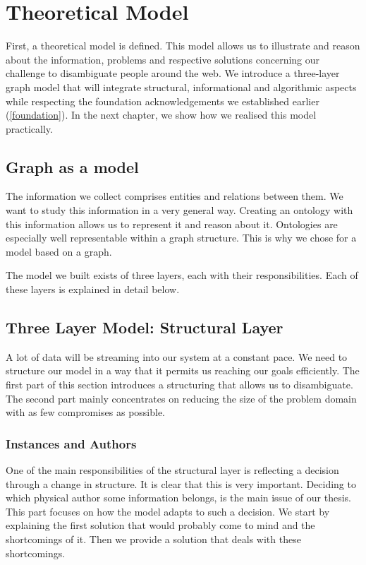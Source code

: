 \chapter{Theoretical Model}

First, a theoretical model is defined. This model allows us to illustrate and reason about the information, problems and respective solutions concerning our challenge to disambiguate people around the web. We introduce a three-layer graph model that will integrate structural, informational and algorithmic aspects while respecting the foundation acknowledgements we established earlier (\autoref{foundation}). In the next chapter, we show how we realised this model practically.

\section{Graph as a model}

The information we collect comprises entities and relations between them. We want to study this information in a very general way. Creating an ontology with this information allows us to represent it and reason about it. Ontologies are especially well representable within a graph structure. This is why we chose for a model based on a graph.

The model we built exists of three layers, each with their responsibilities. Each of these layers is explained in detail below.

\section{Three Layer Model: Structural Layer}
\label{structural layer}

A lot of data will be streaming into our system at a constant pace. We need to structure our model in a way that it permits us reaching our goals efficiently. The first part of this section introduces a structuring that allows us to disambiguate. The second part mainly concentrates on reducing the size of the problem domain with as few compromises as possible.

\subsection{Instances and Authors}

One of the main responsibilities of the structural layer is reflecting a decision through a change in structure. It is clear that this is very important. Deciding to which physical author some information belongs, is the main issue of our thesis. This part focuses on how the model adapts to such a decision. We start by explaining the first solution that would probably come to mind and the shortcomings of it. Then we provide a solution that deals with these shortcomings.

